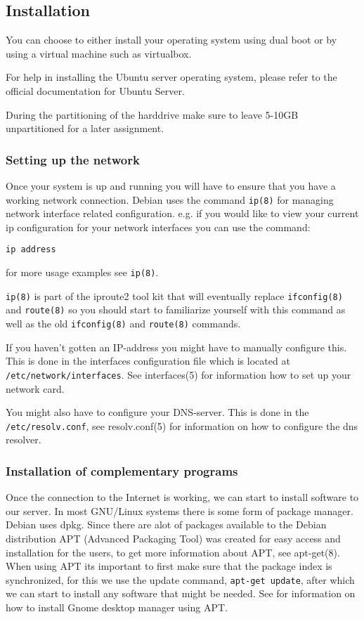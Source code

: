 \documentclass[a4paper]{miunasgn}
\begin{document}
\subsection{Installation}
\label{subsec:Installation}
You can choose to either install your operating system using dual boot or by
using a virtual machine such as virtualbox\citep{vbox}.

For help in installing the Ubuntu server operating system, please refer to the
official documentation for Ubuntu Server\citep{ubuntuinstall}.

During the partitioning of the harddrive make sure to leave 5-10GB unpartitioned
for a later assignment.

\subsubsection{Setting up the network}
\label{subsubsec:Network}
Once your system is up and running you will have to ensure that you have a
working network connection. Debian uses the command \texttt{ip(8)} for managing
network interface related configuration.  e.g. if you would like to view your
current ip configuration for your network interfaces you can use the command:\\
\begin{center}
\texttt{ip address}
\end{center}
for more usage examples see \texttt{ip(8)}.

\texttt{ip(8)} is part of the iproute2 tool kit\citep{iproute2} that will 
eventually replace \texttt{ifconfig(8)} and \texttt{route(8)} so you should
start to familiarize yourself with this command as well as the old \texttt{ifconfig(8)} and \texttt{route(8)} commands.

If you haven't gotten an IP-address you might have to manually configure this.
This is done in the interfaces configuration file which is located at
\texttt{/etc/network/interfaces}. See interfaces(5) for information
how to set up your network card. 

You might also have to configure your DNS-server. This is done in the
 \texttt{/etc/resolv.conf}, see resolv.conf(5) for information on how to 
configure the dns resolver.

\subsubsection{Installation of complementary programs}
\label{subsubsec:complProg}
Once the connection to the Internet is working, we can start to install software
to our server.
In most GNU/Linux systems there is some form of package manager. Debian uses dpkg. 
Since there are alot of packages available to the Debian distribution APT 
(Advanced Packaging Tool) was created for easy access and installation for the
users, to get more information about APT, see apt-get(8).
When using APT its important to first make sure that the package index is
synchronized, for this we use the update command, \texttt{apt-get update}, after
which we can start to install any software that might be needed. 
See \citep{debiangnome} for information on how to install Gnome desktop manager using APT.
\end{document}
